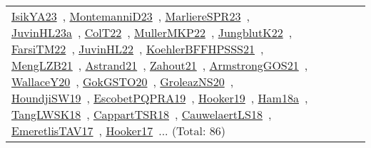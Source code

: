 {\begin{longtable}{lp{3cm}>{\raggedright\arraybackslash}p{6cm}>{\raggedright\arraybackslash}p{6cm}>{\raggedright\arraybackslash}p{8cm}}
\href{../works/IsikYA23.pdf}{IsikYA23}~\cite{IsikYA23}, \href{../works/MontemanniD23.pdf}{MontemanniD23}~\cite{MontemanniD23}, \href{../works/MarliereSPR23.pdf}{MarliereSPR23}~\cite{MarliereSPR23}, \href{../works/JuvinHL23a.pdf}{JuvinHL23a}~\cite{JuvinHL23a}, \href{../works/ColT22.pdf}{ColT22}~\cite{ColT22}, \href{../works/MullerMKP22.pdf}{MullerMKP22}~\cite{MullerMKP22}, \href{../works/JungblutK22.pdf}{JungblutK22}~\cite{JungblutK22}, \href{../works/FarsiTM22.pdf}{FarsiTM22}~\cite{FarsiTM22}, \href{../works/JuvinHL22.pdf}{JuvinHL22}~\cite{JuvinHL22}, \href{../works/KoehlerBFFHPSSS21.pdf}{KoehlerBFFHPSSS21}~\cite{KoehlerBFFHPSSS21}, \href{../works/MengLZB21.pdf}{MengLZB21}~\cite{MengLZB21}, \href{../works/Astrand21.pdf}{Astrand21}~\cite{Astrand21}, \href{../works/Zahout21.pdf}{Zahout21}~\cite{Zahout21}, \href{../works/ArmstrongGOS21.pdf}{ArmstrongGOS21}~\cite{ArmstrongGOS21}, \href{../works/WallaceY20.pdf}{WallaceY20}~\cite{WallaceY20}, \href{../works/GokGSTO20.pdf}{GokGSTO20}~\cite{GokGSTO20}, \href{../works/GroleazNS20.pdf}{GroleazNS20}~\cite{GroleazNS20}, \href{../works/HoundjiSW19.pdf}{HoundjiSW19}~\cite{HoundjiSW19}, \href{../works/EscobetPQPRA19.pdf}{EscobetPQPRA19}~\cite{EscobetPQPRA19}, \href{../works/Hooker19.pdf}{Hooker19}~\cite{Hooker19}, \href{../works/Ham18a.pdf}{Ham18a}~\cite{Ham18a}, \href{../works/TangLWSK18.pdf}{TangLWSK18}~\cite{TangLWSK18}, \href{../works/CappartTSR18.pdf}{CappartTSR18}~\cite{CappartTSR18}, \href{../works/CauwelaertLS18.pdf}{CauwelaertLS18}~\cite{CauwelaertLS18}, \href{../works/EmeretlisTAV17.pdf}{EmeretlisTAV17}~\cite{EmeretlisTAV17}, \href{../works/Hooker17.pdf}{Hooker17}~\cite{Hooker17}... (Total: 86)\\

\end{longtable}}
